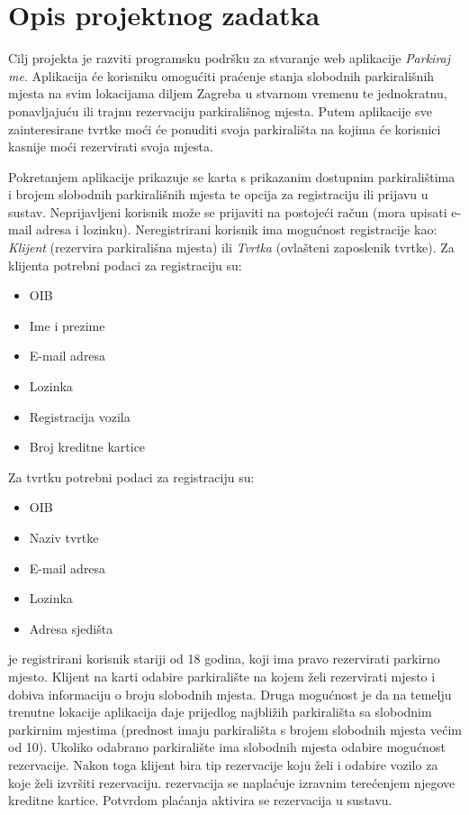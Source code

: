 \chapter{Opis projektnog zadatka}

Cilj projekta je razviti programsku podršku za stvaranje web aplikacije \textit {Parkiraj me}. Aplikacija će korisniku omogućiti praćenje stanja slobodnih parkirališnih mjesta na svim lokacijama diljem Zagreba u stvarnom vremenu te jednokratnu, ponavljajuću ili trajnu rezervaciju parkirališnog mjesta. Putem aplikacije sve zainteresirane tvrtke moći će ponuditi svoja parkirališta na kojima će korisnici kasnije moći rezervirati svoja mjesta.

Pokretanjem aplikacije prikazuje se karta s prikazanim dostupnim parkiralištima i brojem slobodnih parkirališnih mjesta te opcija za registraciju ili prijavu u sustav.\newline 
Neprijavljeni korisnik može se prijaviti na postojeći račun (mora upisati e-mail adresa i lozinku). Neregistrirani korisnik ima mogućnost registracije kao: \textit{Klijent} (rezervira parkirališna mjesta) ili \textit{Tvrtka} (ovlašteni zaposlenik tvrtke).
\newline
Za klijenta potrebni podaci za registraciju su:
\begin{itemize}
    \item OIB
    \item Ime i prezime
    \item E-mail adresa
    \item Lozinka
    \item Registracija vozila
    \item Broj kreditne kartice
\end{itemize}
Za tvrtku potrebni podaci za registraciju su:
\begin{itemize}
    \item OIB
    \item Naziv tvrtke
    \item E-mail adresa
    \item Lozinka
    \item Adresa sjedišta
\end{itemize}

\textit{} je registrirani korisnik stariji od 18 godina, koji ima pravo rezervirati parkirno mjesto. Klijent na karti odabire parkiralište na kojem želi rezervirati mjesto i dobiva informaciju o broju slobodnih mjesta. Druga mogućnost je da na temelju trenutne lokacije aplikacija daje prijedlog najbližih parkirališta sa slobodnim parkirnim mjestima (prednost imaju parkirališta s brojem slobodnih mjesta većim od 10). Ukoliko odabrano parkiralište ima slobodnih mjesta odabire mogućnost rezervacije. Nakon toga klijent bira tip rezervacije koju želi i odabire vozilo za koje želi izvršiti rezervaciju. rezervacija se naplaćuje izravnim terećenjem njegove kreditne kartice. Potvrdom plaćanja aktivira se rezervacija u sustavu. 

